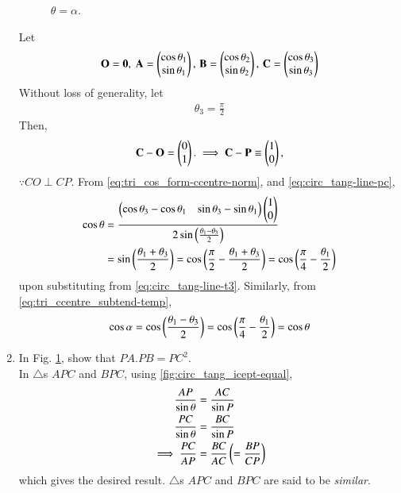 \begin{enumerate}[label=\thesubsection.\arabic*.,ref=\thesubsection.\theenumi]
\begin{figure}[!ht]
\begin{center}
			\resizebox{0.6\columnwidth}{!}{}
		\end{center}
		\caption{$\theta= \alpha$.}
		\label{fig:circ_tang_icept}	
	\end{figure}
	\solution
    Let
  \begin{align}
	  \mathbf{O} = \mathbf{0},\
	  \mathbf{A} = \begin{pmatrix}\cos \theta_1 \\ \sin \theta_1\end{pmatrix},\,
	  \mathbf{B} =  \begin{pmatrix}\cos \theta_2 \\ \sin \theta_2\end{pmatrix},\,
	  \mathbf{C} =  \begin{pmatrix}\cos \theta_3 \\ \sin \theta_3\end{pmatrix}
  \end{align}
  Without loss of generality,  let 
  \begin{align}
	  \theta_3 = \frac{\pi}{2}
		\label{eq:circ_tang-line-t3}	
  \end{align}
  Then, 
  \begin{align}
	  \mathbf{C}-\mathbf{O} = \begin{pmatrix}0 \\ 1\end{pmatrix}.
\implies	  \mathbf{C}-\mathbf{P} \equiv \begin{pmatrix}1 \\ 0\end{pmatrix}
		\label{eq:circ_tang-line-pc},	
  \end{align}
  $\because CO \perp CP$.
From   
\eqref{eq:tri_cos_form-ccentre-norm},
and 
		\eqref{eq:circ_tang-line-pc},	
  \begin{align}
	  \cos \theta &= \frac{
		  \begin{pmatrix}\cos \theta_3-\cos \theta_1 & \sin \theta_3-\sin \theta_1\end{pmatrix}
		  \begin{pmatrix}1 \\ 0\end{pmatrix}
		  }
		  {
	   2 \sin \left(\frac{\theta_1-\theta_3}{2}\right)
			  } 
			  \\
			  &=
	    \sin \left(\frac{\theta_1+\theta_3}{2}\right)
	    =\cos\left(\frac{\pi}{2}-\frac{\theta_1+\theta_3}{2}\right)
	    =\cos\left(\frac{\pi}{4}-\frac{\theta_1}{2}\right)
  \end{align}
  upon substituting from 
		\eqref{eq:circ_tang-line-t3}.  Similarly, 	
		from
\eqref{eq:tri_ccentre_subtend-temp},
  \begin{align}
	  \cos \alpha = \cos \left(\frac{\theta_1-\theta_3}{2}  \right)
	    =\cos\left(\frac{\pi}{4}-\frac{\theta_1}{2}\right)
	  =\cos \theta
  \end{align}
%
\item
	In Fig. \ref{fig:circ_tang_icept}, show that $PA.PB = PC^2$.
\label{them:circ_tang_icept_prod}	
\\
\solution 
In $\triangle$s $APC$ and $BPC$, 
using
		\eqref{fig:circ_tang_icept-equal},	
  \begin{align}
	  \frac{AP}{\sin \theta} &= \frac{AC}{\sin P} 
	  \\
	  \frac{PC}{\sin \theta} &= \frac{BC}{\sin P} 
	  \\
	  \implies \frac{PC}{AP} &= \frac{BC}{AC}  \left(= \frac{BP}{CP}\right)
  \end{align}
  which gives the desired result.
$\triangle$s $APC$ and $BPC$ are said to be {\em similar}.
\end{enumerate}
%
